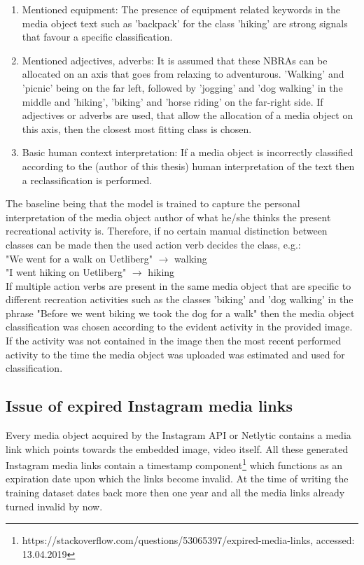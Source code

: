 \begin{enumerate}
    \item Mentioned equipment: The presence of equipment related keywords in the media object text such as 'backpack' for the class 'hiking' are strong signals that favour a specific classification.
    \item Mentioned adjectives, adverbs: It is assumed that these NBRAs can be allocated on an axis that goes from relaxing to adventurous. 'Walking' and 'picnic' being on the far left, followed by 'jogging' and 'dog walking' in the middle and 'hiking', 'biking' and 'horse riding' on the far-right side. If adjectives or adverbs are used, that allow the allocation of a media object on this axis, then the closest most fitting class is chosen.
    \item Basic human context interpretation: If a media object is incorrectly classified according to the (author of this thesis) human interpretation of the text then a reclassification is performed.
\end{enumerate}

The baseline being that the model is trained to capture the personal interpretation of the media object author of what he/she thinks the present recreational activity is. Therefore, if no certain manual distinction between classes can be made then the used action verb decides the class, e.g.:\\
"We went for a walk on Uetliberg" $\to$ walking \\
"I went hiking on Uetliberg" $\to$ hiking\\
If multiple action verbs are present in the same media object that are specific to different recreation activities such as the classes 'biking' and 'dog walking' in the phrase "Before we went biking we took the dog for a walk" then the media object classification was chosen according to the evident activity in the provided image. If the activity was not contained in the image then the most recent performed activity to the time the media object was uploaded was estimated and used for classification.

\subsection{Issue of expired Instagram media links} \label{expired_media_links}
Every media object acquired by the Instagram API or Netlytic contains a media link which points towards the embedded image, video itself. All these generated Instagram media links contain a timestamp component\footnote{https://stackoverflow.com/questions/53065397/expired-media-links, accessed: 13.04.2019} which functions as an expiration date upon which the links become invalid. At the time of writing the training dataset dates back more then one year and all the media links already turned invalid by now. \\

